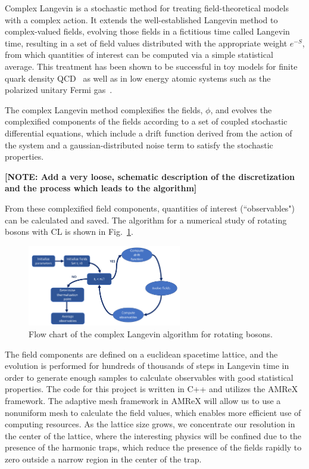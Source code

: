 \documentclass[onecolumn, 12pt]{report}
\newcommand{\note}[1]{{\color{red} \bf[NOTE: #1]}}
\begin{document}
Complex Langevin is a stochastic method for treating field-theoretical models with a complex action. It extends the well-established Langevin method to complex-valued fields, evolving those fields in a fictitious time called Langevin time, resulting in a set of field values distributed with the appropriate weight $e^{-S}$, from which quantities of interest can be computed via a simple statistical average. This treatment has been shown to be successful in toy models for finite quark density QCD~\cite{BergerCLReview} as well as in low energy atomic systems such as the polarized unitary Fermi gas~\cite{BergerCLReview}. 

The complex Langevin method complexifies the fields, $\phi$, and evolves the complexified components of the fields according to a set of coupled stochastic differential equations, which include a drift function derived from the action of the system and a gaussian-distributed noise term to satisfy the stochastic properties. 

%
\note{Add a very loose, schematic description of the discretization and the process which leads to the algorithm}
%

From these complexified field components, quantities of interest (``observables") can be calculated and saved. The algorithm for a numerical study of rotating bosons with CL is shown in Fig.~\ref{Fig:Algorithm}.
%
\begin{figure}[h]
\centering
\includegraphics[width=0.6\textwidth]{./algorithm.pdf}
\caption{\label{Fig:Algorithm} Flow chart of the complex Langevin algorithm for rotating bosons.\vspace{-3mm}}
\end{figure}
%
The field components are defined on a euclidean spacetime lattice, and the evolution is performed for hundreds of thousands of steps in Langevin time in order to generate enough samples to calculate observables with good statistical properties. The code for this project is written in C++ and utilizes the AMReX framework. The adaptive mesh framework in AMReX will allow us to use a nonuniform mesh to calculate the field values, which enables more efficient use of computing resources. As the lattice size grows, we concentrate our resolution in the center of the lattice, where the interesting physics will be confined due to the presence of the harmonic traps, which reduce the presence of the fields rapidly to zero outside a narrow region in the center of the trap.
\end{document}
